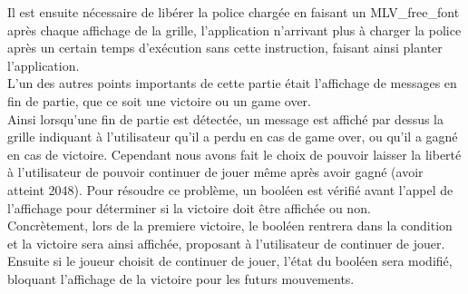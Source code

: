 \documentclass[12pt]{article}
\begin{document}
Il est ensuite nécessaire de libérer la police chargée en faisant un MLV\_free\_font après chaque affichage de la grille, l'application n'arrivant plus à charger la police après un certain temps d'exécution sans cette instruction, faisant ainsi planter l'application.\\

L'un des autres points importants de cette partie était l'affichage de messages en fin de partie, que ce soit une victoire ou un game over.\\
Ainsi lorsqu'une fin de partie est détectée, un message est affiché par dessus la grille indiquant à l'utilisateur qu'il a perdu en cas de game over, ou qu'il a gagné en cas de victoire. Cependant nous avons fait le choix de pouvoir laisser la liberté à l'utilisateur de pouvoir continuer de jouer même après avoir gagné (avoir atteint 2048).
Pour résoudre ce problème, un booléen est vérifié avant l'appel de l'affichage pour déterminer si la victoire doit être affichée ou non.\\
Concrètement, lors de la premiere victoire, le booléen rentrera dans la condition et la victoire sera ainsi affichée, proposant à l'utilisateur de continuer de jouer. Ensuite si le joueur choisit de continuer de jouer, l'état du booléen sera modifié, bloquant l'affichage de la victoire pour les futurs mouvements.
\end{document}
